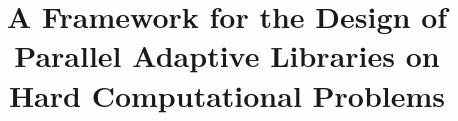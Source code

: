 

\newcommand{\comment}[1]{#1}
\newcommand{\nota}[1]{\comment{\marginpar{---}{\color{red}\textsc{/*#1*/}}}}
\newcommand{\notaazul}[1]{\comment{\marginpar{---}{\color{blue}\textsc{/*#1*/}}}
}
\newcommand{\notalado}[1]{\comment{\marginpar{\color{red}/*#1*/}}}




\newtheorem{property}[theorem]{Property}
\newtheorem{assumption}[theorem]{Assumption}





\title{A Framework for the Design of Parallel Adaptive Libraries on Hard
Computational Problems}



\maketitle


